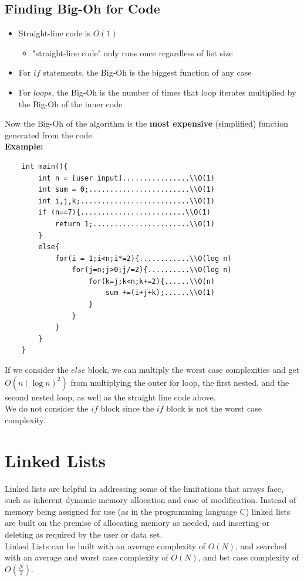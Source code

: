 \documentclass[hidelinks,11pt]{article}
\begin{document}
\subsection{Finding Big-Oh for Code}
\begin{itemize}
    \item Straight-line code is $O(1)$ 
    \begin{itemize}
        \item "straight-line code" only runs once regardless of list size
    \end{itemize}
    \item For $if$ statements, the Big-Oh is the biggest function of any case
    \item For $loops$, the Big-Oh is the number of times that loop iterates multiplied by the Big-Oh of the inner code
\end{itemize}
Now the Big-Oh of the algorithm is the \textbf{most expensive} (simplified) function generated from the code.\\[.5\baselineskip]
\textbf{Example:}
\begin{lstlisting}
    int main(){
        int n = [user input]................\\O(1)
        int sum = 0;........................\\O(1)
        int i,j,k;..........................\\O(1)
        if (n==7){.........................\\O(1)
            return 1;.......................\\O(1)
        }
        else{ 
            for(i = 1;i<n;i*=2){............\\O(log n)
                for(j=n;j>0;j/=2){..........\\O(log n)
                    for(k=j;k<n;k+=2){......\\O(n)
                        sum +=(i+j+k);......\\O(1)
                    }
                }
            }
        }
    }
\end{lstlisting}
If we consider the $else$ block, we can multiply the worst case complexities and get $O(n(\log n)^2)$ from multiplying the outer for loop, the first nested, and the second nested loop, as well as the straight line code above.\\[0.5\baselineskip]
We do not consider the $if$ block since the $if$ block is not the worst case complexity.
\section{Linked Lists}
Linked lists are helpful in addressing some of the limitations that arrays face, such as inherent dynamic memory allocation and ease of modification. Instead of memory being assigned for use (as in the programming language C) linked lists are built on the premise of allocating memory as needed, and inserting or deleting as required by the user or data set. \\[0.5\baselineskip]
Linked Lists can be built with an average complexity of $O(N)$, and searched with an average and worst case complexity of $O(N)$, and bst case complexity of $O(\frac{N}{2})$.
\end{document}
